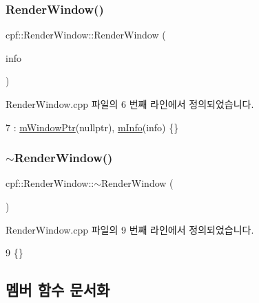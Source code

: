 \subsubsection{\texorpdfstring{Render\+Window()}{RenderWindow()}}
{\footnotesize\ttfamily cpf\+::\+Render\+Window\+::\+Render\+Window (\begin{DoxyParamCaption}\item[{const \hyperlink{structcpf_1_1_render_window_create_info}{Render\+Window\+Create\+Info} \&}]{info }\end{DoxyParamCaption})}



Render\+Window.\+cpp 파일의 6 번째 라인에서 정의되었습니다.


\begin{DoxyCode}
7         : \hyperlink{classcpf_1_1_render_window_a871b4de6be0b9fa29b9394e38c395a04}{mWindowPtr}(\textcolor{keyword}{nullptr}), \hyperlink{classcpf_1_1_render_window_ad3608b5ed5c1b0c5471f96e5c5199eb0}{mInfo}(info) \{\}
\end{DoxyCode}
\mbox{\label{classcpf_1_1_render_window_a1422898fc6458538f6665fa6555ef86c}} 
\subsubsection{\texorpdfstring{$\sim$\+Render\+Window()}{~RenderWindow()}}
{\footnotesize\ttfamily cpf\+::\+Render\+Window\+::$\sim$\+Render\+Window (\begin{DoxyParamCaption}{ }\end{DoxyParamCaption})}



Render\+Window.\+cpp 파일의 9 번째 라인에서 정의되었습니다.


\begin{DoxyCode}
9 \{\}
\end{DoxyCode}


\subsection{멤버 함수 문서화}
\mbox{\label{classcpf_1_1_render_window_a173081ae0a9f72968e8ecf3461c22b3b}} 
